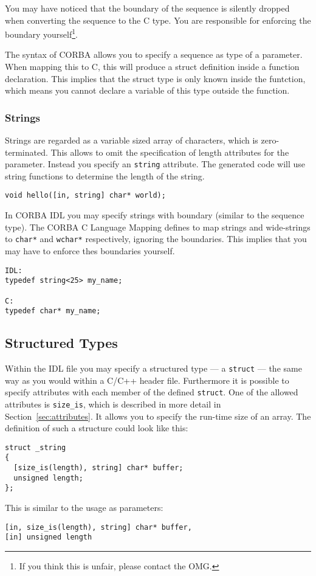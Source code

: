 You may have noticed that the boundary of the sequence is silently dropped
when converting the sequence to the C type. You are responsible for enforcing
the boundary yourself\footnote{If you think this is unfair, please contact the
OMG.}.

The syntax of CORBA allows you to specify a sequence as type of a parameter.
When mapping this to C, this will produce a struct definition inside a
function declaration. This implies that the struct type is only known inside
the funtction, which means you cannot declare a variable of this type outside
the function.

\subsubsection{Strings}
Strings are regarded as a variable sized array of characters, which is 
zero-terminated.
This allows to omit the specification of length attributes for the 
parameter. Instead you specify an \verb|string| attribute. The generated
code will use string functions to determine the length of the string.

\begin{verbatim}
void hello([in, string] char* world);
\end{verbatim}

In CORBA IDL you may specify strings with boundary (similar to the sequence
type). The CORBA C Language Mapping defines to map strings and wide-strings
to \verb|char*| and \verb|wchar*| respectively, ignoring the boundaries. This
implies that you may have to enforce thes boundaries yourself.

\begin{verbatim}
IDL:
typedef string<25> my_name;

C:
typedef char* my_name;
\end{verbatim}

\subsection{Structured Types}
Within the IDL file you may specify a structured type --- a \verb|struct|
 --- the same way as you would within a C/C++ header file. Furthermore
it is possible to specify attributes with each member of the defined
\verb|struct|. One of the allowed attributes is \verb|size_is|, which
is described in more detail in Section~\ref{sec:attributes}. It allows
you to specify the run-time size of an array. The definition of such a
structure could look like this:
\begin{verbatim}
struct _string
{
  [size_is(length), string] char* buffer;
  unsigned length;
};
\end{verbatim}
This is similar to the usage as parameters:
\begin{verbatim}
[in, size_is(length), string] char* buffer,
[in] unsigned length
\end{verbatim}

